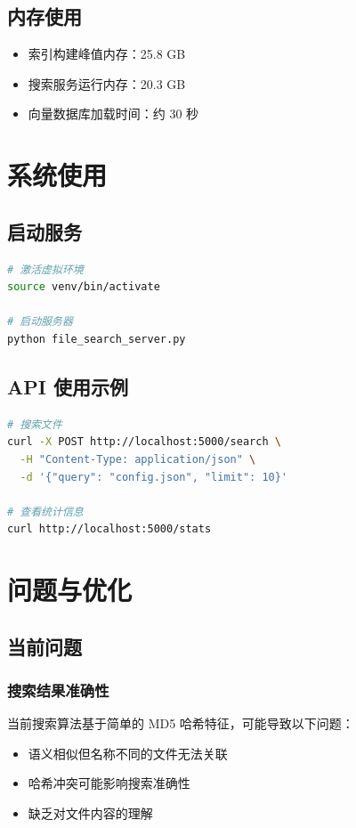 \documentclass[12pt,a4paper]{article}
\begin{document}
\subsection{内存使用}

\begin{itemize}
    \item 索引构建峰值内存：25.8 GB
    \item 搜索服务运行内存：20.3 GB
    \item 向量数据库加载时间：约 30 秒
\end{itemize}

\section{系统使用}

\subsection{启动服务}

\begin{lstlisting}[language=bash,caption=启动搜索服务器]
# 激活虚拟环境
source venv/bin/activate

# 启动服务器
python file_search_server.py
\end{lstlisting}

\subsection{API 使用示例}

\begin{lstlisting}[language=bash,caption=搜索 API 调用]
# 搜索文件
curl -X POST http://localhost:5000/search \
  -H "Content-Type: application/json" \
  -d '{"query": "config.json", "limit": 10}'

# 查看统计信息
curl http://localhost:5000/stats
\end{lstlisting}

\section{问题与优化}

\subsection{当前问题}

\subsubsection{搜索结果准确性}
当前搜索算法基于简单的 MD5 哈希特征，可能导致以下问题：
\begin{itemize}
    \item 语义相似但名称不同的文件无法关联
    \item 哈希冲突可能影响搜索准确性
    \item 缺乏对文件内容的理解
\end{itemize}
\end{document}
